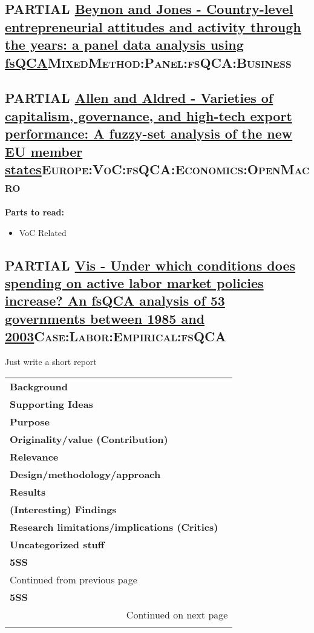 \documentclass[11pt]{article}
\begin{document}
\subsection*{{\bfseries\sffamily PARTIAL} \href{https://doi.org/10.1016/j.jbusres.2019.11.021}{Beynon and Jones - Country-level entrepreneurial attitudes and activity through the years: a panel data analysis using fsQCA}\hfill{}\textsc{MixedMethod:Panel:fsQCA:Business}}
\label{sec:orge54e371}
\subsection*{{\bfseries\sffamily PARTIAL} \href{https://doi.org/10.1108/01425451111140622}{Allen and Aldred - Varieties of capitalism, governance, and high-tech export performance: A fuzzy-set analysis of the new EU member states}\hfill{}\textsc{Europe:VoC:fsQCA:Economics:OpenMacro}}
\label{sec:org93970ef}
\textbf{Parts to read:}

\begin{itemize}
\item VoC Related
\end{itemize}

\subsection*{{\bfseries\sffamily PARTIAL} \href{https://doi.org/10.1017/S1755773910000378}{Vis -  Under which conditions does spending on active labor market policies increase? An fsQCA analysis of 53 governments between 1985 and 2003}\hfill{}\textsc{Case:Labor:Empirical:fsQCA}}
\label{sec:orgb6bab8d}
Just write a short report

\begin{longtable}{l|p{}}
\hline
\hline
\textbf{Background} & \\
\textbf{Supporting Ideas} & \\
\textbf{Purpose} & \\
\textbf{Originality/value (Contribution)} & \\
\textbf{Relevance} & \\
\textbf{Design/methodology/approach} & \\
\textbf{Results} & \\
\textbf{(Interesting) Findings} & \\
\textbf{Research limitations/implications (Critics)} & \\
\textbf{Uncategorized stuff} & \\
\textbf{5SS} & \\
\hline
\endfirsthead
\multicolumn{2}{l}{Continued from previous page} \\

\textbf{5SS} &  \\

\hline
\endhead
\hline\multicolumn{2}{r}{Continued on next page} \\
\endfoot
\endlastfoot
\hline
\hline
\end{longtable}
\end{document}
